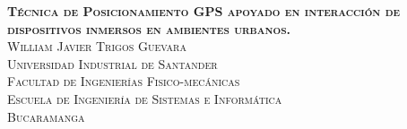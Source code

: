 	\begin{titlepage}
		\begin{center}
			\textsc{\Large \textbf{Técnica de Posicionamiento GPS apoyado en interacción de dispositivos inmersos en ambientes urbanos.}}\\[8cm]

			\textsc{William Javier Trigos Guevara}\\[9cm]
			\textsc{Universidad Industrial de Santander}\\
			\textsc{Facultad de Ingenier\'ias Fisico-mec\'anicas}\\
			\textsc{Escuela de Ingenier\'ia de Sistemas e Inform\'atica}\\
			\textsc{Bucaramanga}\\	
			\the\year
		\end{center}
	\end{titlepage}